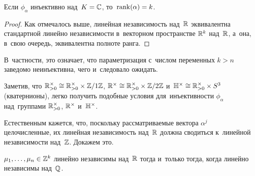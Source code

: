 \documentclass[a4paper,oneside]{article}
\begin{document}
\begin{consequence*}
  Если $\phi_\alpha$ инъективно над~$K = \mathbb{C}$, то~$\mathrm{rank}(\alpha) = k$.
\end{consequence*}

\begin{proof}
  Как отмечалось выше, линейная независимость над~$\mathbb{R}$ эквивалентна стандартной линейно независимости
  в~векторном пространстве $\mathbb{R}^k$ над~$\mathbb{R}$, а~она, в~свою очередь, эквивалентна полноте ранга.
\end{proof}

В~частности, это означает, что параметризация с~числом переменных $k > n$ заведомо неинъективна, чего и~следовало ожидать.

Заметив, что $\mathbb{R}_{>0}^\times \cong \mathbb{R}_{>0}^\times \times \mathbb{Z} / 1\mathbb{Z}$, $\mathbb{R}^\times \cong \mathbb{R}_{>0}^\times \times \mathbb{Z} / 2 \mathbb{Z}$
и~$\mathbb{H}^\times \cong \mathbb{R}_{>0}^\times \times S^3$ (кватернионы), легко получить подобные условия для~инъективности
$\phi_\alpha$ над~группами $\mathbb{R}_{>0}^\times$, $\mathbb{R}^\times$ и~$\mathbb{H}^\times$.

Естественным кажется, что, поскольку рассматриваемые вектора $\alpha^j$ целочисленные, их линейная независимость
над~$\mathbb{R}$ должна сводиться к~линейной независимости над~$\mathbb{Z}$. Докажем это.

\begin{lemma*}[\cite{SE20}]
  $\mu_1, \ldots, \mu_n \in \mathbb{Z}^k$ линейно независимы над~$\mathbb{R}$ тогда и~только тогда, когда линейно независимы над~$\mathbb{Q}$.
\end{lemma*}
\end{document}
